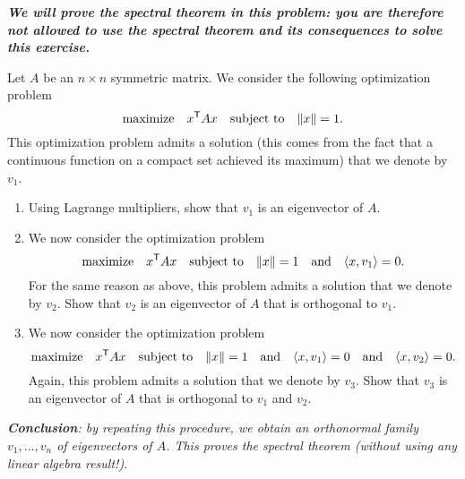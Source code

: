 \documentclass[11pt,nocut]{article}
\begin{document}
\begin{problem}[3 points]
	\emph{\textbf{We will prove the spectral theorem in this problem: you are therefore not allowed to use the spectral theorem and its consequences to solve this exercise.}}

	Let $A$ be an $n \times n$ symmetric matrix. We consider the following optimization problem
	\begin{equation}\label{eq:eig1}
		\text{maximize} \quad x^{{\sf T}} A x \quad \text{subject to} \quad \|x\| = 1.
	\end{equation}
	This optimization problem admits a solution (this comes from the fact that a continuous function on a compact set achieved its maximum) that we denote by $v_1$.
	\begin{enumerate}[label=\normalfont(\textbf{\alph*})]
		\item Using Lagrange multipliers, show that $v_1$ is an eigenvector of $A$.
		\item We now consider the optimization problem
	\begin{equation}\label{eq:eig2}
		\text{maximize} \quad x^{{\sf T}} A x \quad \text{subject to} \quad \|x\| = 1
		\quad \text{and} \quad \langle x,v_1 \rangle = 0.
	\end{equation}
	For the same reason as above, this problem admits a solution that we denote by $v_2$. Show that $v_2$ is an eigenvector of $A$ that is orthogonal to $v_1$.
		\item We now consider the optimization problem
	\begin{equation}\label{eq:eig3}
		\text{maximize} \quad x^{{\sf T}} A x \quad \text{subject to} \quad \|x\| = 1
		\quad \text{and} \quad \langle x,v_1 \rangle = 0
		\quad \text{and} \quad \langle x,v_2 \rangle = 0.
	\end{equation}
	Again, this problem admits a solution that we denote by $v_3$. Show that $v_3$ is an eigenvector of $A$ that is orthogonal to $v_1$ and $v_2$.
	\end{enumerate}
	\emph{
		\textbf{Conclusion}: by repeating this procedure, we obtain an orthonormal family $v_1, \dots, v_n$ of eigenvectors of $A$. This proves the spectral theorem (without using any linear algebra result!).
	}
\end{problem}


\vspace{5mm}
\end{document}
